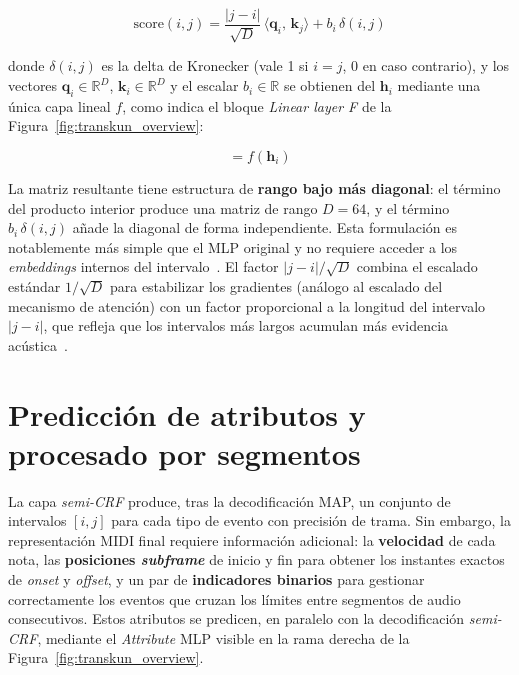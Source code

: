 \documentclass[11pt,spanish,listoffigures,listoftables]{tfgetsinf}
\begin{document}
\begin{equation}
  \text{score}(i, j) = \frac{|j - i|}{\sqrt{D}}\,\langle \boldsymbol{q}_i,\,
  \boldsymbol{k}_j \rangle + b_i\,\delta(i, j)
  \label{eq:scoring_ip}
\end{equation}

\noindent donde $\delta(i, j)$ es la delta de Kronecker (vale 1 si $i = j$, 0 en
caso contrario), y los vectores $\boldsymbol{q}_i \in \mathbb{R}^D$,
$\boldsymbol{k}_i \in \mathbb{R}^D$ y el escalar $b_i \in \mathbb{R}$ se obtienen
del  $\boldsymbol{h}_i$ mediante una única capa
lineal $f$, como indica el bloque \textit{Linear layer F} de la
Figura~\ref{fig:transkun_overview}:

\begin{equation}
  [\boldsymbol{q}_i,\, \boldsymbol{k}_i,\, b_i] = f(\boldsymbol{h}_i)
  \label{eq:kqb}
\end{equation}

La matriz resultante tiene estructura de \textbf{rango bajo más diagonal}: el
término del producto interior produce una matriz de rango $D = 64$, y el término
$b_i\,\delta(i,j)$ añade la diagonal de forma independiente. Esta formulación es
notablemente más simple que el MLP original y no requiere acceder a los
\textit{embeddings} internos del intervalo~\cite{yan2024transkun}. El factor
$|j-i|/\sqrt{D}$ combina el escalado estándar $1/\sqrt{D}$ para estabilizar los
gradientes (análogo al escalado del mecanismo de atención) con un factor
proporcional a la longitud del intervalo $|j-i|$, que refleja que los intervalos
más largos acumulan más evidencia acústica~\cite{yan2024transkun}.



\section{Predicción de atributos y procesado por segmentos}
\label{sec:transkun_attrs}

La capa \textit{semi-CRF} produce, tras la decodificación MAP, un conjunto de intervalos
$[i, j]$ para cada tipo de evento con precisión de trama. Sin embargo, la
representación MIDI final requiere información adicional: la \textbf{velocidad}
de cada nota, las \textbf{posiciones \textit{subframe}} de inicio y fin para obtener
los instantes exactos de \textit{onset} y \textit{offset}, y un par de \textbf{indicadores binarios}
para gestionar correctamente los eventos que cruzan los límites entre segmentos
de audio consecutivos. Estos atributos se predicen, en paralelo con la
decodificación \textit{semi-CRF}, mediante el \textit{Attribute} MLP visible en la rama derecha de
la Figura~\ref{fig:transkun_overview}.
\end{document}
